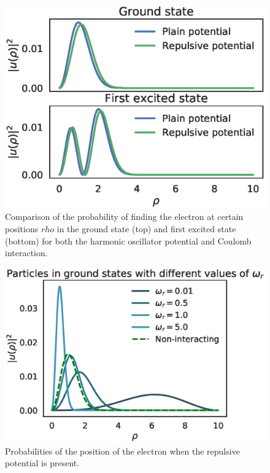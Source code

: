 \documentclass[aps,reprint]{revtex4-1}
\begin{document}
\begin{figure}[ht]
  \centering
  \includegraphics[width=\columnwidth]{figures/excitation.eps}
  \caption{\label{fig:excitation} Comparison of the probability of finding the
    electron at certain positions \(rho\) in the ground state (top) and first
    excited state (bottom) for both the harmonic oscillator potential and
    Coulomb interaction.}
\end{figure}


\begin{figure}[ht]
  \centering
  \includegraphics[width=\columnwidth]{figures/omegas.eps}
  \caption{\label{fig:omegas} Probabilities of the position of the electron when
  the repulsive potential is present.}
\end{figure}
\end{document}

